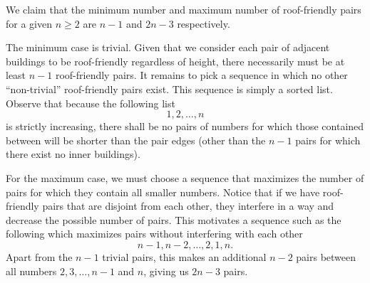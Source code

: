 \begin{solution}{3}
    We claim that the minimum number and maximum number of roof-friendly pairs for a given \( n \geq 2 \) are \( n - 1 \) and \( 2n - 3 \) respectively.

    The minimum case is trivial. Given that we consider each pair of adjacent buildings to be roof-friendly regardless of height, there necessarily must be at least \( n - 1 \) roof-friendly pairs. It remains to pick a sequence in which no other ``non-trivial'' roof-friendly pairs exist. This sequence is simply a sorted list. Observe that because the following list
    \[
        1, 2, \ldots, n
    \]
    is strictly increasing, there shall be no pairs of numbers for which those contained between will be shorter than the pair edges (other than the \( n - 1 \) pairs for which there exist no inner buildings).

    For the maximum case, we must choose a sequence that maximizes the number of pairs for which they contain all smaller numbers. Notice that if we have roof-friendly pairs that are disjoint from each other, they interfere in a way and decrease the possible number of pairs. This motivates a sequence such as the following which maximizes pairs without interfering with each other
    \[
        n - 1, n - 2, \ldots, 2, 1, n
    .\]
    Apart from the \( n - 1 \) trivial pairs, this makes an additional \( n - 2 \) pairs between all numbers \( 2, 3, \ldots, n - 1 \) and \( n \), giving us \( 2n - 3 \) pairs.
\end{solution}
